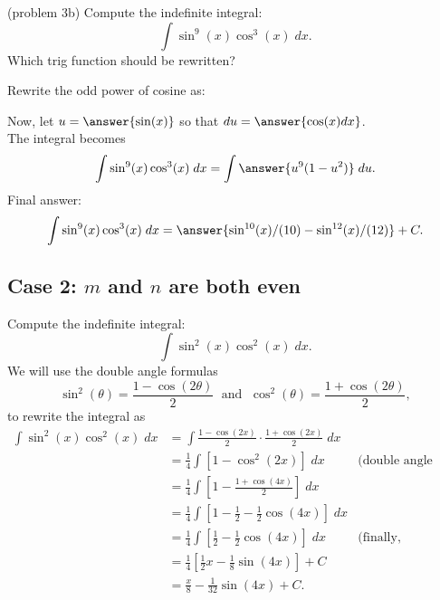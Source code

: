\documentclass{ximera}
\begin{document}
\begin{problem}(problem 3b)
Compute the indefinite integral:
\[
\int \sin^9(x)\cos^3(x) \; dx.
\]
Which trig function should be rewritten?
\begin{multipleChoice}
\end{multipleChoice}

Rewrite the odd power of cosine as:
\begin{multipleChoice}
\end{multipleChoice}

Now, let $u = \answer{\sin(x)}$ so that $du = \answer{\cos(x) dx}$.\\
The integral becomes
\[
\int \sin^9(x)\cos^3(x) \; dx= \int \answer{u^9(1 - u^2)} \; du.
\]
Final answer:
\[
\int \sin^9(x)\cos^3(x) \; dx= \answer{\sin^{10}(x)/(10) - \sin^{12}(x)/(12) } + C.
\]
\end{problem}



\subsection{Case 2: $m$ and $n$ are both even}
\begin{example}
Compute the indefinite integral:
\[
\int \sin^2(x)\cos^2(x) \; dx.
\]
We will use the double angle formulas
\[
\sin^2(\theta) = \frac{1-\cos(2\theta)}{2} \; \text{ and } \; \cos^2(\theta) = \frac{1+\cos(2\theta)}{2},
\]
to rewrite the integral as
\begin{align*}
\int \sin^2(x)\cos^2(x) \; dx &= \int \frac{1-\cos(2x)}{2}\cdot \frac{1+\cos(2x)}{2} \; dx\\
  &= \frac14 \int \left[1 - \cos^2(2x)\right] \; dx &
  \text{(double angle formula again)}\\
  &= \frac14 \int \left[ 1- \frac{1+\cos(4x)}{2}\right] \; dx\\
  &= \frac14 \int \left[1-\frac12 - \frac12\cos(4x)\right] \; dx\\
  &= \frac14 \int \left[\frac12 - \frac12\cos(4x)\right] \; dx & \text{(finally, integrate)}\\
  &= \frac14 \left[\frac12 x  - \frac18\sin(4x)\right] + C\\
  &= \frac{x}{8}  - \frac{1}{32}\sin(4x) + C.
\end{align*}
\end{example}
\end{document}
